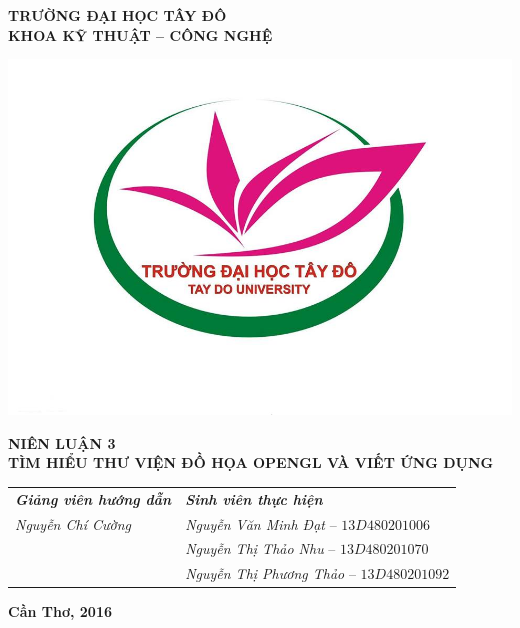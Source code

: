 \begin{titlepage}
	\centering
	\newcommand{\HRule}{\rule{.3\linewidth}{0.5mm}}
	\vspace{-1.5cm}
	\begin{center}
{\large \textbf{TRƯỜNG ĐẠI HỌC TÂY ĐÔ\vspace{.2cm}\\KHOA KỸ THUẬT -- CÔNG NGHỆ\\\vspace{1.0cm}}}
	\end{center}
	\includegraphics[width=.55\textwidth]{logo_tdu.jpg}\par\vspace{1.0cm}
	{\LARGE \textbf{NIÊN LUẬN 3} \vspace{.5cm} \\  \textbf{TÌM HIỂU THƯ VIỆN ĐỒ HỌA OPENGL VÀ VIẾT ỨNG DỤNG}\par}%
	\vspace{2cm}
	
	\begin{tabular}{ll}
	{\large \textbf{\textit{Giảng viên hướng dẫn}}} & {\qquad \large \textbf{\textit{Sinh viên thực hiện}}}\vspace{.3cm}\\
	{\large \textit{Nguyễn Chí Cường}} & {\qquad \large \textit{Nguyễn Văn Minh Đạt} \hspace{0.7cm}-- $13D480201006$} \vspace{.2cm}\\
	 & {\qquad \large \textit{Nguyễn Thị Thảo Nhu} \hspace{.8cm}-- $13D480201070$} \vspace{.2cm}\\	
	  & {\qquad \large \textit{Nguyễn Thị Phương Thảo} -- $13D480201092$} \vspace{.2cm}\\
	\end{tabular}
	
	\vfill
	
	
	\vfill
	
	{\large \textbf{Cần Thơ, 2016}\vspace{.5cm}}
\end{titlepage}

